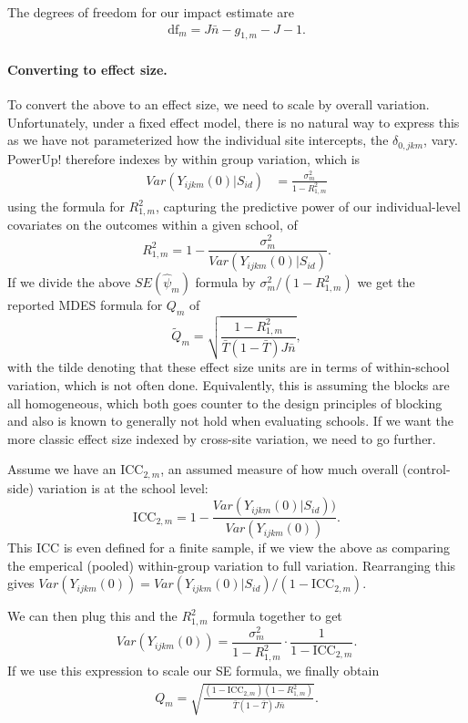 \documentclass[12pt]{article}
\begin{document}
The degrees of freedom for our impact estimate are
\begin{align}\text{df}_m = J \bar{n} - g_{1,m} - J - 1.\end{align}


\paragraph{Converting to effect size.}
To convert the above to an effect size, we need to scale by overall variation.
Unfortunately, under a fixed effect model, there is no natural way to express this as we have not parameterized how the individual site intercepts, the $\delta_{0,jkm}$, vary.
PowerUp! therefore indexes by within group variation, which is
\begin{align*}
Var( Y_{ijkm}(0) | S_{id} ) &= \frac{ \sigma^2_m }{ 1 - R^2_{1,m} } \end{align*}
using the formula for $R^2_{1,m}$, capturing the predictive power of our individual-level covariates on the outcomes within a given school, of
\[ R^2_{1,m} = 1 - \frac{ \sigma^2_m }{ Var( Y_{ijkm}(0) |  S_{id} )} . \]
If we divide the above $SE(\hat{\psi}_m)$ formula by $\sigma^2_m/(1 - R^2_{1,m})$ we get  the reported MDES formula for $Q_m$ of
\[ 
\tilde{Q}_m = \sqrt{\frac{1-R^2_{1,m}}{\bar{T}(1 - \bar{T}) J \bar{n}}} ,
\]
with the tilde denoting that these effect size units are in terms of within-school variation, which is not often done.
Equivalently, this is assuming the blocks are all homogeneous, which both goes counter to the design principles of blocking and also is known to generally not hold when evaluating schools.
If we want the more classic effect size indexed by cross-site variation, we need to go further.

Assume we have an $\text{ICC}_{2,m}$, an assumed measure of how much overall (control-side) variation is at the school level:
\[ \text{ICC}_{2,m} = 1 - \frac{ Var( Y_{ijkm}(0) |  S_{id} ) ) }{ Var( Y_{ijkm}(0)) } . \]
This ICC is even defined for a finite sample, if we view the above as comparing the emperical (pooled) within-group variation to full variation.
Rearranging this gives $Var( Y_{ijkm}(0) ) = Var(  Y_{ijkm}(0) |  S_{id} ) /(1 - \text{ICC}_{2,m})$.

We can then plug this and the $R^2_{1,m}$ formula together to get
\[ Var( Y_{ijkm}(0) ) = \frac{ \sigma^2_m }{ 1 - R^2_{1,m} } \cdot \frac{1}{1- \text{ICC}_{2,m}} .\]
If we use this expression to scale our SE formula, we finally obtain
\begin{align} Q_m = \sqrt{\frac{(1-\text{ICC}_{2,m})(1-R^2_{1,m})}{\bar{T}(1 - \bar{T}) J \bar{n}}} . \end{align}
\end{document}
